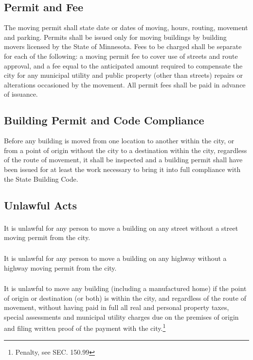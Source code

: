 \subsection{Permit and Fee}
The moving permit shall state date or dates of moving, hours, routing, movement and parking. Permits shall be issued only for moving buildings by building movers licensed by the State of Minnesota. Fees to be charged shall be separate for each of the following: a moving permit fee to cover use of streets and route approval, and a fee equal to the anticipated amount required to compensate the city for any municipal utility and public property (other than streets) repairs or alterations occasioned by the movement. All permit fees shall be paid in advance of issuance.
\subsection{Building Permit and Code Compliance}
Before any building is moved from one location to another within the city, or from a point of origin without the city to a destination within the city, regardless of the route of movement, it shall be inspected and a building permit shall have been issued for at least the work necessary to bring it into full compliance with the State Building Code.
\subsection{Unlawful Acts}
\subsubsection{}
It is unlawful for any person to move a building on any street without a street moving permit from the city.
\subsubsection{}
It is unlawful for any person to move a building on any highway without a highway moving permit from the city.
\subsubsection{}
It is unlawful to move any building (including a manufactured home) if the point of origin or destination (or both) is within the city, and regardless of the route of movement, without having paid in full all real and personal property taxes, special assessments and municipal utility charges due on the premises of origin and filing written proof of the payment with the city.\footnote{Penalty, see SEC. 150.99}


